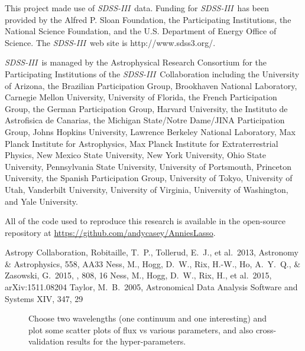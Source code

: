 \documentclass[12pt,preprint]{aastex}
\newcommand{\project}[1]{\textsl{#1}}
\newcommand{\acronym}[1]{{\small{#1}}}
\newcommand{\sdssiii}{\project{\acronym{SDSS-III}}}
\begin{document}

This project made use of \sdssiii\ data.
Funding for \sdssiii\ has been provided by the Alfred P. Sloan
Foundation, the Participating Institutions, the National Science
Foundation, and the \acronym{U.S.} Department of Energy Office of Science. The
\sdssiii\ web site is http://www.sdss3.org/.

\sdssiii\ is managed by the Astrophysical Research Consortium for the
Participating Institutions of the \sdssiii\ Collaboration including the
University of Arizona, the Brazilian Participation Group, Brookhaven
National Laboratory, Carnegie Mellon University, University of
Florida, the French Participation Group, the German Participation
Group, Harvard University, the Instituto de Astrofisica de Canarias,
the Michigan State/Notre Dame/\acronym{JINA} Participation Group, Johns Hopkins
University, Lawrence Berkeley National Laboratory, Max Planck
Institute for Astrophysics, Max Planck Institute for Extraterrestrial
Physics, New Mexico State University, New York University, Ohio State
University, Pennsylvania State University, University of Portsmouth,
Princeton University, the Spanish Participation Group, University of
Tokyo, University of Utah, Vanderbilt University, University of
Virginia, University of Washington, and Yale University.

All of the code used to reproduce this research is available in the open-source
repository at \url{https://github.com/andycasey/AnniesLasso}.



\begin{thebibliography}{dummy}\raggedright
{} Astropy Collaboration, Robitaille, T.~P., Tollerud, E.~J., et al.\ 2013, Astronomy \& Astrophysics, 558, AA33 
 Ness, M., Hogg, D.~W., 
Rix, H.-W., Ho, A.~Y.~Q., \& Zasowski, G.\ 2015, \apj, 808, 16
 Ness, M., Hogg, D.~W., 
Rix, H., et al.\ 2015, arXiv:1511.08204 
 Taylor, M.~B.\ 2005, Astronomical Data Analysis Software and Systems XIV, 347, 29 
\end{thebibliography}

\clearpage

\begin{figure}[p]
\caption{Choose two wavelengths (one continuum and one interesting)
  and plot some scatter plots of flux vs various parameters, and also
  cross-validation results for the
  hyper-parameters.\label{fig:onewavelength}}
\end{figure}
\end{document}
